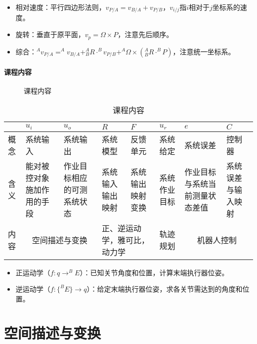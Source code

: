 \documentclass[
12pt, %
a4paper, 
oneside, %
headinclude,footinclude, %
]{scrartcl}
\begin{document}
\begin{itemize}
\item 相对速度：平行四边形法则，$ v_{P/A} = v_{B/A} + v_{P/B} $，$ v_{i/j} $指$ i $相对于$ j $坐标系的速度。
\item 旋转：垂直于原平面，$ v_p = \Omega \times P $，注意先后顺序。
\item 综合：$ ^A v_{P/A} = ^A v_{B/A} + ^A_B R \cdot ^B v_{P/B} + ^A \Omega \times (^A_B R \cdot ^B P) $，注意统一坐标系。
\end{itemize}
\paragraph{课程内容}
\begin{figure}[H]
\centering
{} \quad
{}
\caption[课程内容]{课程内容}
\end{figure}

\begin{table}[hbt]
\caption{课程内容}
\centering
\begin{tabular}{|p{0.5cm}|p{2cm}|p{2cm}|p{2cm}|p{2cm}|p{2cm}|p{2cm}|p{2cm}|}
\hline
& $ u_i $ & $ u_o $ & $ R $ & $ F $ & $ u_r $ & $ e $ & $ C $ \\
\hline
概念 & 系统输入 & 系统输出 & 系统模型 & 反馈单元 & 系统给定 & 系统误差 & 控制器 \\
\hline
含义 & 能对被控对象施加作用的手段 & 作业目标相应的可测系统状态 & 系统输入输出映射 & 系统输出映射变换 & 系统作业目标 & 作业目标与系统当前测量状态差值 & 系统误差与输入映射 \\
\hline
内容 & \multicolumn{2}{c|}{空间描述与变换} & \multicolumn{2}{p{4cm}|}{正、逆运动学，雅可比，动力学} & 轨迹规划 & \multicolumn{2}{c|}{机器人控制} \\
\hline
\end{tabular}
\end{table}

\begin{itemize}
\item 正运动学（$ f:q \rightarrow ^B E $）：已知关节角度和位置，计算末端执行器位姿。
\item 逆运动学（$ f:\{^B E\} \rightarrow q $）：给定末端执行器位姿，求各关节需达到的角度和位置。
\end{itemize}
\section{空间描述与变换}
\end{document}
